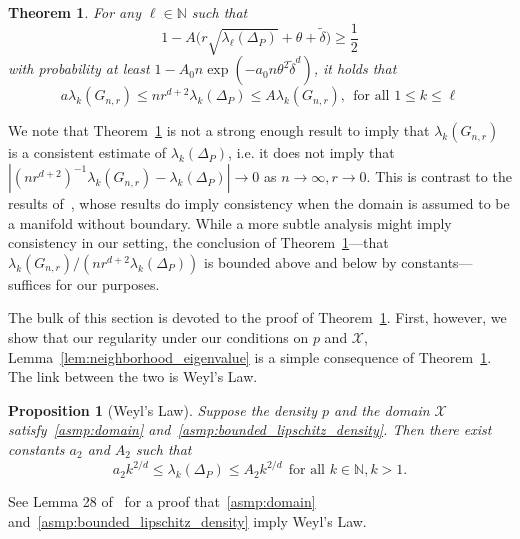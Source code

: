 \documentclass[twoside]{article}
\newcommand{\1}{\mathbf{1}}
\newcommand{\Xset}{\mathcal{X}}
\newcommand{\wt}[1]{\widetilde{#1}}
\newtheorem{theorem}{Theorem}
\newtheorem{proposition}{Proposition}
\theoremstyle{definition}
\theoremstyle{remark}
\begin{document}
\begin{theorem}
	\label{thm:neighborhood_eigenvalue}
	For any $\ell \in \mathbb{N}$ such that
	\begin{equation}
	\label{eqn:neighborhood_eigenvalue_1}
	1 - A\Biggl(r \sqrt{\lambda_{\ell}(\Delta_P)} + \theta + \wt{\delta}\Biggr)\geq \frac{1}{2}
	\end{equation}
	with probability at least $1 - A_0n\exp(-a_0n\theta^2\wt{\delta}^{d})$, it holds that
	\begin{equation}
	\label{eqn:eigenvalue_bound}
	a \lambda_k(G_{n,r}) \leq nr^{d+2} \lambda_k(\Delta_P) \leq A \lambda_k(G_{n,r}),~~\textrm{for all $1 \leq k \leq \ell$}
	\end{equation}
\end{theorem}
We note that Theorem~\ref{thm:neighborhood_eigenvalue} is not a strong enough result to imply that $\lambda_{k}(G_{n,r})$ is a consistent estimate of $\lambda_k(\Delta_P)$, i.e. it does not imply that $|(nr^{d + 2})^{-1}\lambda_{k}(G_{n,r}) - \lambda_k(\Delta_P)| \to 0$ as $n \to \infty, r \to 0$. This is contrast to the results of~\citet{burago2014,trillos2019,calder2019}, whose results do imply consistency when the domain is assumed to be a manifold without boundary. While a more subtle analysis might imply consistency in our setting, the conclusion of Theorem~\ref{thm:neighborhood_eigenvalue}---that $\lambda_k(G_{n,r})/(nr^{d + 2}\lambda_k(\Delta_P))$ is bounded above and below by constants---suffices for our purposes.  

The bulk of this section is devoted to the proof of Theorem~\ref{thm:neighborhood_eigenvalue}. First, however, we show that our regularity under our conditions on $p$ and $\Xset$, Lemma~\ref{lem:neighborhood_eigenvalue} is a simple consequence of Theorem~\ref{thm:neighborhood_eigenvalue}. The link between the two is Weyl's Law.
\begin{proposition}[Weyl's Law]
	\label{prop:weyl}
	Suppose the density $p$ and the domain $\Xset$ satisfy~\ref{asmp:domain} and~\ref{asmp:bounded_lipschitz_density}. Then there exist constants $a_2$ and $A_2$ such that
	\begin{equation}
	\label{eqn:weyls_law}
	a_2k^{2/d} \leq \lambda_k(\Delta_P) \leq A_2k^{2/d}~~\textrm{for all $k \in \mathbb{N}, k > 1$}.
	\end{equation}
\end{proposition}
See Lemma 28 of~\citet{dunlop2020} for a proof that~\ref{asmp:domain} and~\ref{asmp:bounded_lipschitz_density} imply Weyl's Law.
\end{document}
